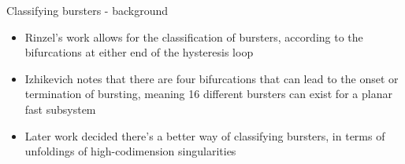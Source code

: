 \documentclass{beamer}
\begin{document}
\begin{frame}[label={sec:org5148b45}]{Classifying bursters - background}
\begin{itemize}[<+->]
\item Rinzel's work allows for the classification of bursters, according to the bifurcations at either end of the hysteresis loop
\item Izhikevich notes that there are four bifurcations that can lead to the onset or termination of bursting, meaning 16 different bursters can exist for a planar fast subsystem
\item Later work decided there's a better way of classifying bursters, in terms of unfoldings of high-codimension singularities
\end{itemize}
\end{frame}
\end{document}
